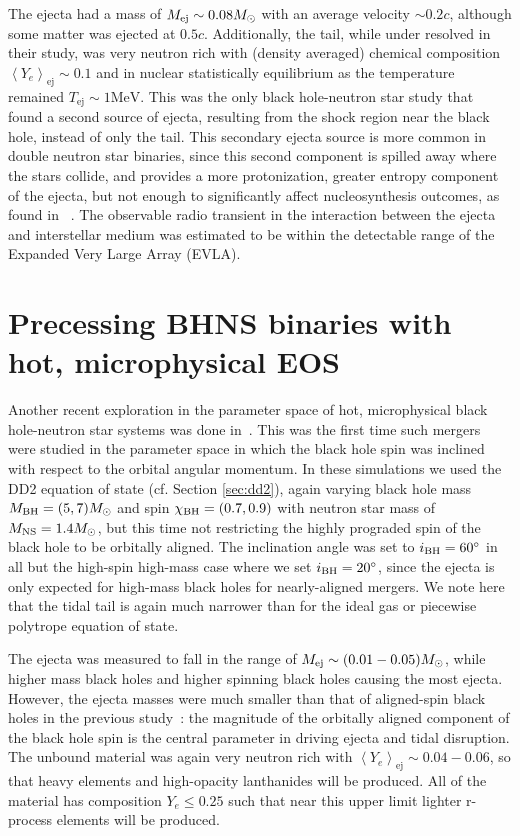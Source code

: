 The ejecta had a mass of $M_{\rm ej} \sim 0.08 M_\odot$ with an average velocity $\sim 0.2 c$, although some matter was ejected at $0.5 c$. 
Additionally, the tail, while under resolved in their study, was very neutron rich with (density averaged) chemical composition $\left\langle Y_e \right\rangle_\textrm{ej} \sim 0.1$  and in nuclear statistically equilibrium as the temperature remained $T_\textrm{ej} \sim 1 \textrm{MeV}$.  
This was the only black hole-neutron star study that found a second source of ejecta, resulting from the shock region near the black hole, instead of only the tail.
This secondary ejecta source is more common in double neutron star binaries, since this second component is spilled away where the stars collide, and provides a more protonization, greater entropy component of the ejecta, but not enough to significantly affect nucleosynthesis outcomes, as found in ~\cite{Roberts2012}.
The observable radio transient in the interaction between the ejecta and interstellar medium was estimated to be within the detectable range of the Expanded Very Large Array (EVLA).


\section{Precessing BHNS binaries with hot, microphysical EOS}

Another recent exploration in the parameter space of hot, microphysical black hole-neutron star systems was done in~\cite{FoucartDD2:2017}.
This was the first time such mergers were studied in the parameter space in which the black hole spin was inclined with respect to the orbital angular momentum. 
In these simulations we used the DD2 equation of state (cf. Section \ref{sec:dd2}), again varying black hole mass $M_{\rm BH} = (5, 7) M_\odot$ and spin $\chi_{\rm BH} = (0.7, 0.9)$ with neutron star mass of $M_{\rm NS} = 1.4 M_\odot$, but this time not restricting the highly prograded spin of the black hole to be orbitally aligned.
The inclination angle was set to $i_{\rm BH}=60^{\circ}$ in all but the high-spin high-mass case where we set $i_{\rm BH}=20^{\circ}$, since the ejecta is only expected for high-mass black holes for nearly-aligned mergers.
We note here that the tidal tail is again much narrower than for the ideal gas or piecewise polytrope equation of state.  

The ejecta was measured to fall in the range of $M_{\rm ej} \sim (0.01 - 0.05) M_\odot$, while higher mass black holes and higher spinning black holes causing the most ejecta.  
However, the ejecta masses were much smaller than that of aligned-spin black holes in the previous study~\cite{Foucart:2014nda}: the magnitude of the orbitally aligned component of the black hole spin is the central parameter in driving ejecta and tidal disruption.  
The unbound material was again very neutron rich with $\left\langle Y_e \right\rangle_\textrm{ej} \sim 0.04 - 0.06$, so that heavy elements and high-opacity lanthanides will be produced.
All of the material has composition $Y_e \le 0.25$ such that near this upper limit lighter r-process elements will be produced.

